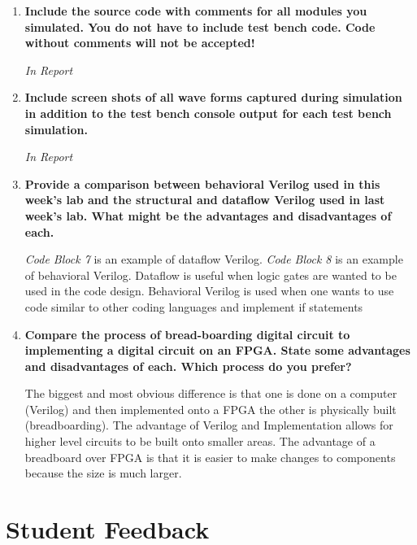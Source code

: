 \documentclass[a4paper,12pt]{article}
\begin{document}
\begin{enumerate}
  \item \textbf{Include the source code with comments for all modules you simulated. You do not have to include test bench code. Code without comments will not be accepted!}

  \textit{In Report}

  \item \textbf{Include screen shots of all wave forms captured during simulation in addition to the test bench console output for each test bench simulation.}

  \textit{In Report}

  \item \textbf{Provide a comparison between behavioral Verilog used in this week’s lab and the structural and dataflow Verilog used in last week’s lab. What might be the advantages and disadvantages of each.}

  \textit{Code Block 7} is an example of dataflow Verilog. \textit{Code Block 8} is
  an example of behavioral Verilog. Dataflow is useful when logic gates are
  wanted to be used in the code design. Behavioral Verilog is used when one
  wants to use code similar to other coding languages and implement if statements

  

  

  \item \textbf{Compare the process of bread-boarding digital circuit to implementing a digital circuit on an FPGA. State some advantages and disadvantages of each. Which process do you prefer?}

  The biggest and most obvious difference is that one is done on a computer (Verilog) and then implemented onto a FPGA the other is physically built (breadboarding). The advantage of Verilog and
  Implementation allows for higher level circuits to be built onto smaller areas. The advantage of a breadboard over FPGA is that it is easier to make changes to components because the size is much larger.

\end{enumerate}

\section*{Student Feedback}
\end{document}
